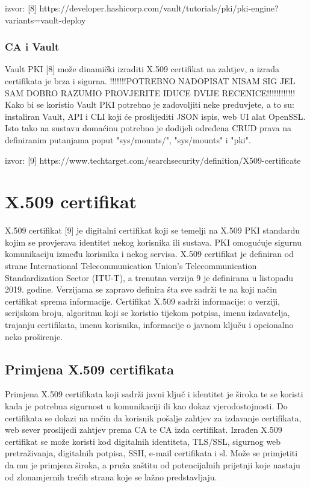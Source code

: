 \documentclass[]{foi}
\begin{document}
\cite{hashicorp-vault-pki-engine}
izvor: [8] https://developer.hashicorp.com/vault/tutorials/pki/pki-engine?variants=vault-deploy%

\subsection{CA i Vault}

Vault PKI [8] može dinamički izraditi X.509 certifikat na zahtjev, a izrada certifikata je brza i sigurna.
!!!!!!!POTREBNO NADOPISAT NISAM SIG JEL SAM DOBRO RAZUMIO PROVJERITE IDUCE DVIJE RECENICE!!!!!!!!!!!!
Kako bi se koristio Vault PKI potrebno je zadovoljiti neke preduvjete, a to su: instaliran Vault, API i CLI koji će proslijediti JSON ispis, web UI alat OpenSSL.
Isto tako na sustavu domaćinu potrebno je dodijeli određena CRUD prava na definiranim putanjama poput "sys/mounts/", "sys/mounts" i "pki".

\cite{techtarget-x509-certificate}
izvor: [9] https://www.techtarget.com/searchsecurity/definition/X509-certificate

\chapter{X.509 certifikat}

X.509 certifikat [9] je digitalni certifikat koji se temelji na X.509 PKI standardu kojim se provjerava identitet nekog korisnika ili sustava.
PKI omogućuje sigurnu komunikaciju između korisnika i nekog servisa.
X.509 certifikat je definiran od strane International Telecommunication Union's Telecommunication Standardization Sector (ITU-T), a trenutna verzija 9 je definirana u listopadu 2019. godine.
Verzijama se zapravo definira šta sve sadrži te na koji način certifikat sprema informacije.
Certifikat X.509 sadrži informacije: o verziji, serijskom broju, algoritmu koji se koristio tijekom potpisa, imenu izdavatelja, trajanju certifikata, imenu korisnika, informacije o javnom ključu i opcionalno neko proširenje.

\section{Primjena X.509 certifikata}

Primjena X.509 certifikata koji sadrži javni ključ i identitet je široka te se koristi kada je potrebna sigurnost u komunikaciji ili kao dokaz vjerodostojnosti.
Do certifikata se dolazi na način da korisnik pošalje zahtjev za izdavanje certifikata, web sever proslijedi zahtjev prema CA te CA izda certifikat.
Izrađen X.509 certifikat se može koristi kod digitalnih identiteta, TLS/SSL, sigurnog web pretraživanja, digitalnih potpisa, SSH, e-mail certifikata i sl.
Može se primjetiti da mu je primjena široka, a pruža zaštitu od potencijalnih prijetnji koje nastaju od zlonamjernih trećih strana koje se lažno predstavljaju.
\end{document}
